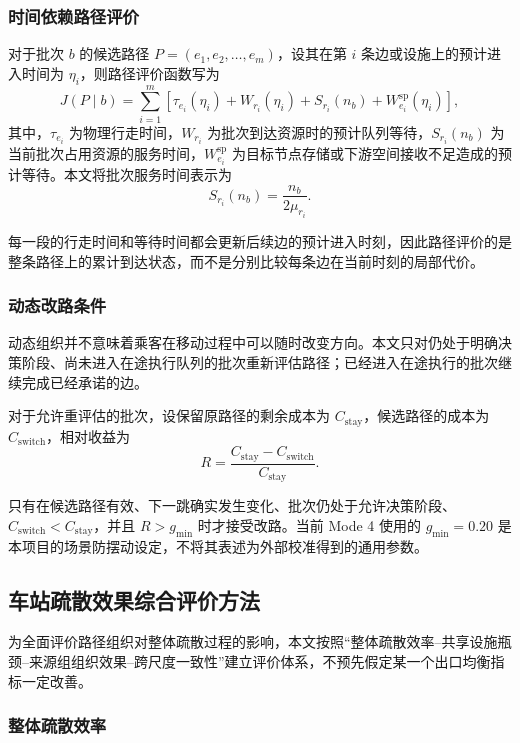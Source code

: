 \documentclass[UTF8,a4paper,12pt]{ctexart}
\begin{document}
\subsubsection{时间依赖路径评价}

对于批次 \(b\) 的候选路径 \(P=(e_1,e_2,\ldots,e_m)\)，设其在第 \(i\) 条边或设施上的预计进入时间为 \(\eta_i\)，则路径评价函数写为
\[
J(P\mid b)=\sum_{i=1}^{m}
\left[\tau_{e_i}(\eta_i)+W_{r_i}(\eta_i)+S_{r_i}(n_b)+W^{\mathrm{sp}}_{e_i}(\eta_i)\right],
\]
其中，\(\tau_{e_i}\) 为物理行走时间，\(W_{r_i}\) 为批次到达资源时的预计队列等待，\(S_{r_i}(n_b)\) 为当前批次占用资源的服务时间，\(W^{\mathrm{sp}}_{e_i}\) 为目标节点存储或下游空间接收不足造成的预计等待。本文将批次服务时间表示为
\[
S_{r_i}(n_b)=\frac{n_b}{2\mu_{r_i}}.
\]

每一段的行走时间和等待时间都会更新后续边的预计进入时刻，因此路径评价的是整条路径上的累计到达状态，而不是分别比较每条边在当前时刻的局部代价。

\subsubsection{动态改路条件}

动态组织并不意味着乘客在移动过程中可以随时改变方向。本文只对仍处于明确决策阶段、尚未进入在途执行队列的批次重新评估路径；已经进入在途执行的批次继续完成已经承诺的边。

对于允许重评估的批次，设保留原路径的剩余成本为 \(C_{\mathrm{stay}}\)，候选路径的成本为 \(C_{\mathrm{switch}}\)，相对收益为
\[
R=\frac{C_{\mathrm{stay}}-C_{\mathrm{switch}}}{C_{\mathrm{stay}}}.
\]

只有在候选路径有效、下一跳确实发生变化、批次仍处于允许决策阶段、\(C_{\mathrm{switch}}<C_{\mathrm{stay}}\)，并且 \(R>g_{\min}\) 时才接受改路。当前 Mode 4 使用的 \(g_{\min}=0.20\) 是本项目的场景防摆动设定，不将其表述为外部校准得到的通用参数。

\subsection{车站疏散效果综合评价方法}

为全面评价路径组织对整体疏散过程的影响，本文按照“整体疏散效率--共享设施瓶颈--来源组组织效果--跨尺度一致性”建立评价体系，不预先假定某一个出口均衡指标一定改善。

\subsubsection{整体疏散效率}
\end{document}
